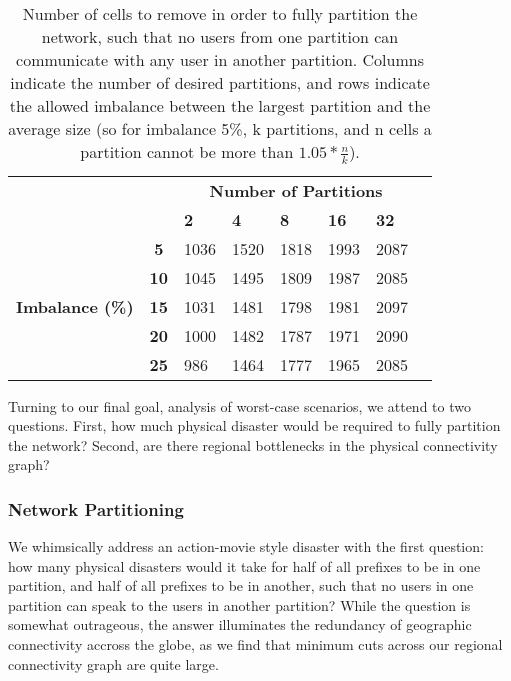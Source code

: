     \begin{table}
        \centering
        \begin{tabular}{lc|l|l|l|l|l|l}
            &&\multicolumn{5}{c}{\bf Number of Partitions}\\
            &&{\bf 2}&{\bf 4}&{\bf 8}&{\bf 16}&{\bf 32}\\
            \hline
            \multirow{5}{*}{\begin{sideways}{\bf Imbalance (\%)}\end{sideways}}
            &{\bf 5}&1036&1520&1818&1993&2087\\
            &{\bf 10}&1045&1495&1809&1987&2085\\
            &{\bf 15}&1031&1481&1798&1981&2097\\
            &{\bf 20}&1000&1482&1787&1971&2090\\
            &{\bf 25}&986&1464&1777&1965&2085\\
        \end{tabular}
        \caption[]{\label{tbl:hmetis} Number of cells to remove in order to fully partition the network, such that no users from one partition can communicate with any user in another partition. Columns indicate the number of desired partitions, and rows indicate the allowed imbalance between the largest partition and the average size (so for imbalance 5\%, k partitions, and n cells a partition cannot be more than $1.05 * \frac{n}{k}$). }
    \end{table}
        
    Turning to our final goal, analysis of worst-case scenarios, we attend to two questions. 
    First, how much physical disaster would be required to fully partition the network?         
    Second, are there regional bottlenecks in the physical connectivity graph?

    \subsubsection*{Network Partitioning}
    We whimsically address an action-movie style disaster with the first question: how many physical disasters would it take for half of all prefixes to be in one partition, and half of all prefixes to be in another, such that no users in one partition can speak to the users in another partition?
    While the question is somewhat outrageous, the answer illuminates the redundancy of geographic connectivity accross the globe, as we find that minimum cuts across our regional connectivity graph are quite large.
    

